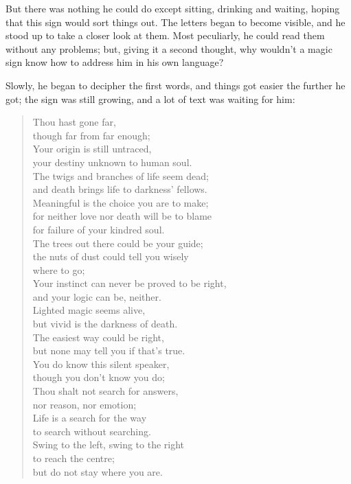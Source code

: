 But there was nothing he could do except sitting, drinking and waiting, hoping that this sign would sort things out. 
The letters began to become visible, and he stood up to take a closer look at them. Most peculiarly, he could read them without any problems; but, giving it a second thought, why wouldn't a magic sign know how to address him in his own language?

Slowly, he began to decipher the first words, and things got easier the further he got; the sign was still growing, and a lot of text was waiting for him:
\begin{verse}
Thou hast gone far,\\
though far from far enough;\\
Your origin is still untraced,\\
your destiny unknown to human soul.\\
The twigs and branches of life seem dead;\\
and death brings life to darkness' fellows.\\
Meaningful is the choice you are to make;\\
for neither love nor death will be to blame\\
for failure of your kindred soul.\\
The trees out there could be your guide;\\
the nuts of dust could tell you wisely\\
where to go;\\
Your instinct can never be proved to be right,\\
and your logic can be, neither.\\
Lighted magic seems alive,\\
but vivid is the darkness of death.\\
The easiest way could be right,\\
but none may tell you if that's true.\\
You do know this silent speaker,\\
though you don't know you do;\\
Thou shalt not search for answers,\\
nor reason, nor emotion;\\
Life is a search for the way\\
to search without searching.\\
Swing to the left, swing to the right\\
to reach the centre;\\
but do not stay where you are.\\

\end{verse}
